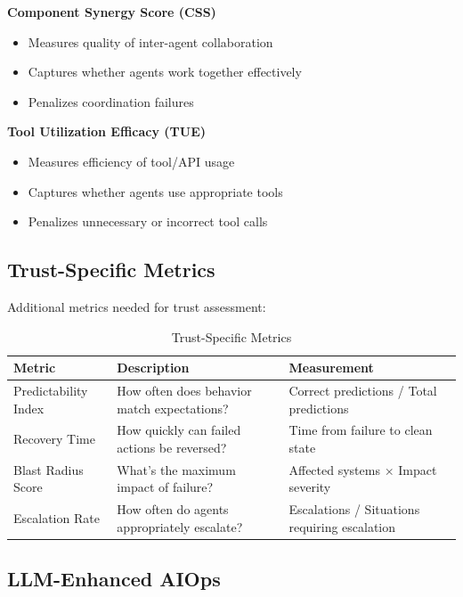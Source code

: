 \textbf{Component Synergy Score (CSS)}
\begin{itemize}
    \item Measures quality of inter-agent collaboration
    \item Captures whether agents work together effectively
    \item Penalizes coordination failures
\end{itemize}

\textbf{Tool Utilization Efficacy (TUE)}
\begin{itemize}
    \item Measures efficiency of tool/API usage
    \item Captures whether agents use appropriate tools
    \item Penalizes unnecessary or incorrect tool calls
\end{itemize}

\subsection{Trust-Specific Metrics}
\label{subsec:trust-metrics}

Additional metrics needed for trust assessment:

\begin{table}[htbp]
\centering
\caption{Trust-Specific Metrics}
\label{tab:trust-metrics}
\begin{tabular}{lll}
\toprule
\textbf{Metric} & \textbf{Description} & \textbf{Measurement} \\
\midrule
Predictability Index & How often does behavior match expectations? & Correct predictions / Total predictions \\
Recovery Time & How quickly can failed actions be reversed? & Time from failure to clean state \\
Blast Radius Score & What's the maximum impact of failure? & Affected systems $\times$ Impact severity \\
Escalation Rate & How often do agents appropriately escalate? & Escalations / Situations requiring escalation \\
\bottomrule
\end{tabular}
\end{table}

\subsection{LLM-Enhanced AIOps}
\label{subsec:llm-aiops}

